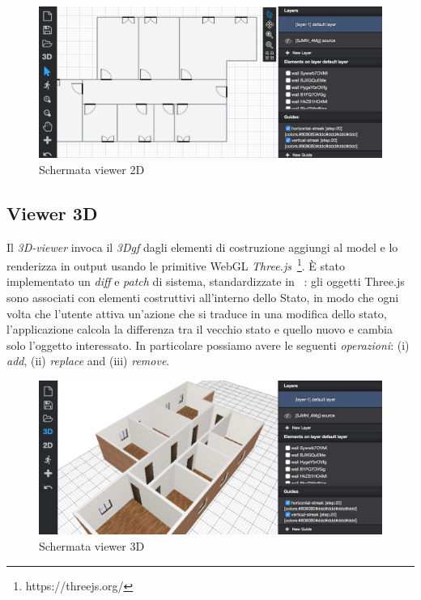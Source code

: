 \begin{figure}[htbp] %
   \centering
   \includegraphics[width=1\linewidth]{images/2d}
   \caption{Schermata viewer 2D}
   \label{fig:view2D}
\end{figure}
\newpage


\subsection{Viewer 3D}
Il \emph{3D-viewer} invoca il \emph{3Dgf} dagli elementi di costruzione aggiungi al model e lo renderizza in output usando le primitive WebGL
\emph{Three.js}~\footnote{https://threejs.org/}. \`E stato implementato un \emph{diff} e \emph{patch} di
sistema, standardizzate in ~\cite{rfc6902}: gli oggetti Three.js sono associati con elementi costruttivi all'interno dello Stato,
in modo che ogni volta che l'utente attiva un'azione che si traduce in una modifica dello stato, l'applicazione calcola
la differenza tra il vecchio stato e quello nuovo e cambia solo l'oggetto interessato. In particolare possiamo avere le seguenti \textit{operazioni}:
(i) \emph{add}, (ii) \emph{replace} and (iii) \emph{remove}.\\

\begin{figure}[htbp] %
   \centering
   \includegraphics[width=1\linewidth]{images/3d}
   \caption{Schermata viewer 3D }
   \label{fig:viewer3D}
\end{figure}
\newpage
